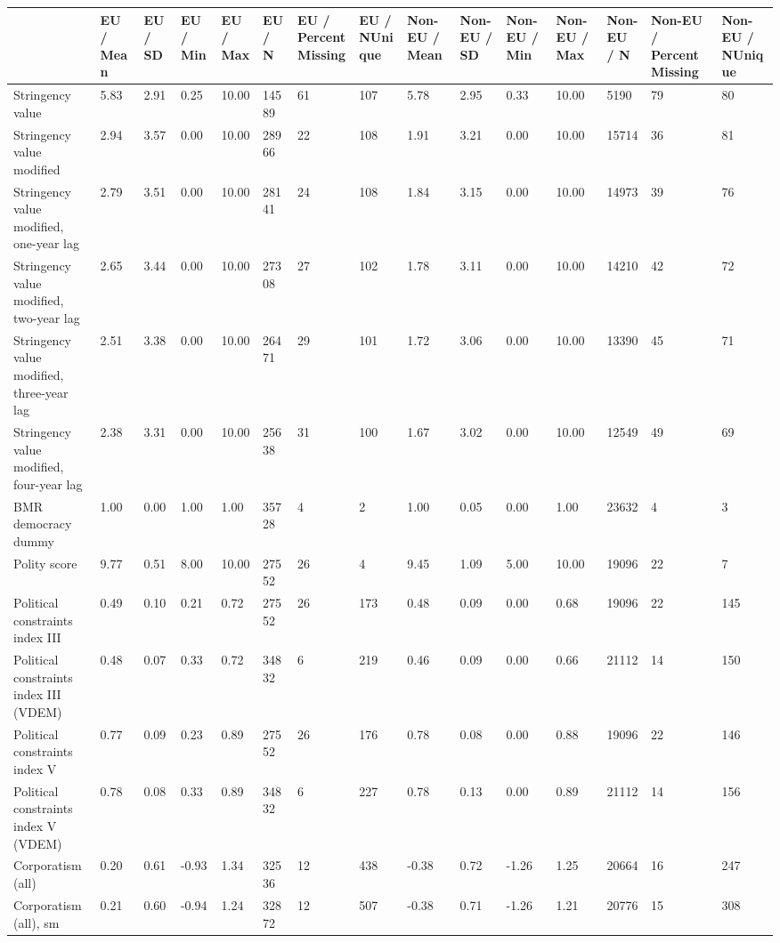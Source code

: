 
\begin{longtable}{lllllllllllllll}
\toprule
  & EU / Mean & EU / SD & EU / Min & EU / Max & EU / N & EU / PercentMissing & EU / NUnique & Non-EU / Mean & Non-EU / SD & Non-EU / Min & Non-EU / Max & Non-EU / N & Non-EU / PercentMissing & Non-EU / NUnique\\
\midrule
Stringency value & 5.83 & 2.91 & 0.25 & 10.00 & 14589 & 61 & 107 & 5.78 & 2.95 & 0.33 & 10.00 & 5190 & 79 & 80\\
Stringency value modified & 2.94 & 3.57 & 0.00 & 10.00 & 28966 & 22 & 108 & 1.91 & 3.21 & 0.00 & 10.00 & 15714 & 36 & 81\\
Stringency value modified, one-year lag & 2.79 & 3.51 & 0.00 & 10.00 & 28141 & 24 & 108 & 1.84 & 3.15 & 0.00 & 10.00 & 14973 & 39 & 76\\
Stringency value modified, two-year lag & 2.65 & 3.44 & 0.00 & 10.00 & 27308 & 27 & 102 & 1.78 & 3.11 & 0.00 & 10.00 & 14210 & 42 & 72\\
Stringency value modified, three-year lag & 2.51 & 3.38 & 0.00 & 10.00 & 26471 & 29 & 101 & 1.72 & 3.06 & 0.00 & 10.00 & 13390 & 45 & 71\\
\addlinespace
Stringency value modified, four-year lag & 2.38 & 3.31 & 0.00 & 10.00 & 25638 & 31 & 100 & 1.67 & 3.02 & 0.00 & 10.00 & 12549 & 49 & 69\\
BMR democracy dummy & 1.00 & 0.00 & 1.00 & 1.00 & 35728 & 4 & 2 & 1.00 & 0.05 & 0.00 & 1.00 & 23632 & 4 & 3\\
Polity score & 9.77 & 0.51 & 8.00 & 10.00 & 27552 & 26 & 4 & 9.45 & 1.09 & 5.00 & 10.00 & 19096 & 22 & 7\\
Political constraints index III & 0.49 & 0.10 & 0.21 & 0.72 & 27552 & 26 & 173 & 0.48 & 0.09 & 0.00 & 0.68 & 19096 & 22 & 145\\
Political constraints index III (VDEM) & 0.48 & 0.07 & 0.33 & 0.72 & 34832 & 6 & 219 & 0.46 & 0.09 & 0.00 & 0.66 & 21112 & 14 & 150\\
\addlinespace
Political constraints index V & 0.77 & 0.09 & 0.23 & 0.89 & 27552 & 26 & 176 & 0.78 & 0.08 & 0.00 & 0.88 & 19096 & 22 & 146\\
Political constraints index V (VDEM) & 0.78 & 0.08 & 0.33 & 0.89 & 34832 & 6 & 227 & 0.78 & 0.13 & 0.00 & 0.89 & 21112 & 14 & 156\\
Corporatism (all) & 0.20 & 0.61 & -0.93 & 1.34 & 32536 & 12 & 438 & -0.38 & 0.72 & -1.26 & 1.25 & 20664 & 16 & 247\\
Corporatism (all), sm & 0.21 & 0.60 & -0.94 & 1.24 & 32872 & 12 & 507 & -0.38 & 0.71 & -1.26 & 1.21 & 20776 & 15 & 308\\

\end{longtable}
